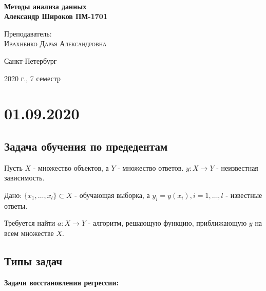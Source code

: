 \documentclass[%
10pt, %
final, %
oneside, %
onecolumn, %
centertags]{article} %
\theoremstyle{plain}
\theoremstyle{definition}
\theoremstyle{remark}
\begin{document}
\begin{titlepage} 
\begin{center}
\textbf{}\\[10.0cm]
\textbf{\LARGE Методы анализа данных}\\[0.5cm]
\textbf{\Large Александр Широков ПМ-1701} \\[0.2cm]


\begin{center} \large
{Преподаватель:} \\[0.5cm]
\textsc {Ивахненко Дарья Александровна}\\
\end{center}

\vfill 



{\large {Санкт-Петербург}} \par
{\large {2020 г., 7 семестр}}
\end{center} 
\end{titlepage}

\begin{thebibliography}{3}
\end{thebibliography}
\tableofcontents
\newpage

\section{01.09.2020}

\subsection{Задача обучения по предедентам}

Пусть $X$ - множество объектов, а $Y$ - множество ответов. $y: X \to Y$ - неизвестная зависимость.

Дано: $\{x_1,\ldots,x_l\} \subset X$ - обучающая выборка, а $y_i = y(x_i), i = 1, \ldots,l$ - известные ответы.

Требуется найти $a: X \to Y$ - алгоритм, решающую функцию, приближающую $y$ на всем множестве $X$.

\subsection{Типы задач}

\textbf{Задачи восстановления регрессии:}
\end{document}

